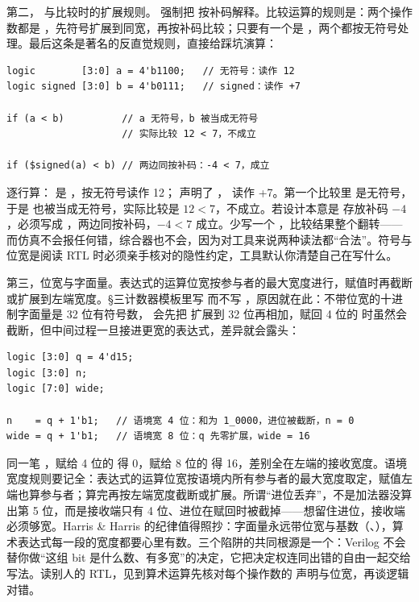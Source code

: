 第二， 与比较时的扩展规则。 强制把  按补码解释。比较运算的规则是：两个操作数都是 ，先符号扩展到同宽，再按补码比较；只要有一个是 ，两个都按无符号处理。最后这条是著名的反直觉规则，直接给踩坑演算：

\begin{lstlisting}
logic        [3:0] a = 4'b1100;   // 无符号：读作 12
logic signed [3:0] b = 4'b0111;   // signed：读作 +7

if (a < b)          // a 无符号，b 被当成无符号
                    // 实际比较 12 < 7，不成立

if ($signed(a) < b) // 两边同按补码：-4 < 7，成立
\end{lstlisting}

逐行算： 是 ，按无符号读作 12； 声明了 ， 读作 +7。第一个比较里  是无符号，于是  也被当成无符号，实际比较是 $12<7$，不成立。若设计本意是  存放补码 $-4$，必须写成 ，两边同按补码，$-4<7$ 成立。少写一个 ，比较结果整个翻转——而仿真不会报任何错，综合器也不会，因为对工具来说两种读法都“合法”。符号与位宽是阅读 RTL 时必须亲手核对的隐性约定，工具默认你清楚自己在写什么。

第三，位宽与字面量。表达式的运算位宽按参与者的最大宽度进行，赋值时再截断或扩展到左端宽度。§三计数器模板里写  而不写 ，原因就在此：不带位宽的十进制字面量是 32 位有符号数， 会先把  扩展到 32 位再相加，赋回 4 位的  时虽然会截断，但中间过程一旦接进更宽的表达式，差异就会露头：

\begin{lstlisting}
logic [3:0] q = 4'd15;
logic [3:0] n;
logic [7:0] wide;

n    = q + 1'b1;   // 语境宽 4 位：和为 1_0000，进位被截断，n = 0
wide = q + 1'b1;   // 语境宽 8 位：q 先零扩展，wide = 16
\end{lstlisting}

同一笔 ，赋给 4 位的  得 0，赋给 8 位的  得 16，差别全在左端的接收宽度。语境宽度规则要记全：表达式的运算位宽按语境内所有参与者的最大宽度取定，赋值左端也算参与者；算完再按左端宽度截断或扩展。所谓“进位丢弃”，不是加法器没算出第 5 位，而是接收端只有 4 位、进位在赋回时被截掉——想留住进位，接收端必须够宽。Harris \& Harris 的纪律值得照抄：字面量永远带位宽与基数（、），算术表达式每一段的宽度都要心里有数。三个陷阱的共同根源是一个：Verilog 不会替你做“这组 bit 是什么数、有多宽”的决定，它把决定权连同出错的自由一起交给写法。读别人的 RTL，见到算术运算先核对每个操作数的  声明与位宽，再谈逻辑对错。

